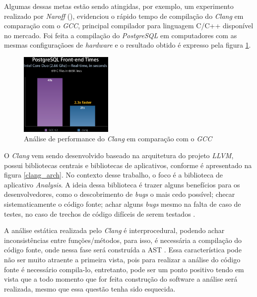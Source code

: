Algumas dessas metas estão sendo atingidas, por exemplo, um experimento
realizado por \emph{Naroff} (\citeyear{naroff2009}), evidenciou o rápido
tempo de compilação do \emph{Clang} em comparação com o \emph{GCC}, principal
compilador para linguagem C/C++ disponível no mercado. Foi feita a compilação do \textit{PostgreSQL} em computadores com as
mesmas configuraçãoes de \textit{hardware} e o resultado obtido é expresso pela figura \ref{clang_gcc}.

\begin{figure}[h]
  \centering
  \includegraphics[width=0.4\textwidth]
      {figuras/clang_gcc.eps}
      \caption{Análise de performance do \emph{Clang} em comparação com o
      \emph{GCC}}
  \label{clang_gcc}
\end{figure}

O \emph{Clang} vem sendo desenvolvido baseado na arquitetura do projeto
\emph{LLVM}, possui bibliotecas centrais e bibliotecas de 
aplicativos, conforme é apresentado na figura \ref{clang_arch}. No contexto desse trabalho, o foco é a biblioteca de aplicativo
\textit{Analysis}. A ideia dessa biblioteca é trazer alguns benefícios para os desenvolvedores, como o descobrimento de 
\textit{bugs} o mais cedo possível; checar sistematicamente o código fonte; achar alguns \textit{bugs} mesmo na falta de caso
de testes, no caso de trechos de código difíceis de serem testados \cite{kremenek2009}. 

A análise estática realizada pelo \emph{Clang} é interprocedural, podendo achar inconsistências entre funções/métodos, para isso,
é necessária a compilação do código fonte, onde nessa fase será construída a AST 
\cite{kremenek2009}. Essa característica pode não ser muito atraente a primeira vista, pois para realizar a análise do código 
fonte é necessário compila-lo, entretanto, pode ser um ponto positivo tendo em vista que a todo momento que for feita 
construção do software a análise será realizada, mesmo que essa questão tenha sido esquecida.

